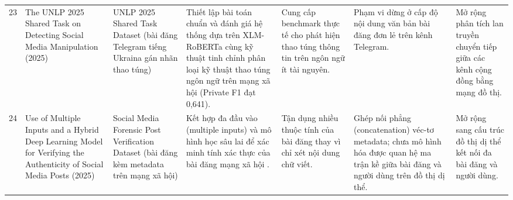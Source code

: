 \documentclass[11pt,a4paper]{extreport}
\begin{document}
\begin{landscape}
\begin{longtable}{@{}C{0.6cm}p{3.6cm}p{2.7cm}p{4.8cm}p{3.6cm}p{3.6cm}p{3.6cm}@{}}
23 & The UNLP 2025 Shared Task on Detecting Social Media Manipulation (2025) \cite{noauthor_unlp_2025} & UNLP 2025 Shared Task Dataset (bài đăng Telegram tiếng Ukraina gán nhãn thao túng) & Thiết lập bài toán chuẩn và đánh giá hệ thống dựa trên XLM-RoBERTa cùng kỹ thuật tinh chỉnh phân loại kỹ thuật thao túng ngôn ngữ trên mạng xã hội (Private F1 đạt 0,641). & Cung cấp benchmark thực tế cho phát hiện thao túng thông tin trên ngôn ngữ ít tài nguyên. & Phạm vi dừng ở cấp độ nội dung văn bản bài đăng đơn lẻ trên kênh Telegram. & Mở rộng phân tích lan truyền chuyển tiếp giữa các kênh cộng đồng bằng mạng đồ thị. \\ 

24 & Use of Multiple Inputs and a Hybrid Deep Learning Model for Verifying the Authenticity of Social Media Posts (2025) \cite{noauthor_use_2025} & Social Media Forensic Post Verification Dataset (bài đăng kèm metadata trên mạng xã hội) & Kết hợp đa đầu vào (multiple inputs) và mô hình học sâu lai để xác minh tính xác thực của bài đăng mạng xã hội \cite{noauthor_use_2025}. & Tận dụng nhiều thuộc tính của bài đăng thay vì chỉ xét nội dung chữ viết. & Ghép nối phẳng (concatenation) véc-tơ metadata; chưa mô hình hóa được quan hệ ma trận kề giữa bài đăng và người dùng trên đồ thị dị thể. & Mở rộng sang cấu trúc đồ thị dị thể kết nối đa bài đăng và người dùng. \\ 
\end{longtable}


\end{landscape}
\end{document}
